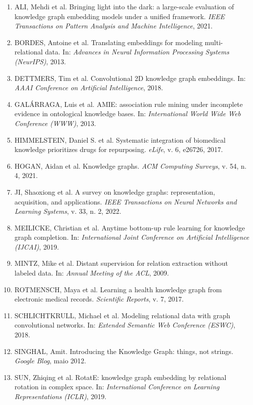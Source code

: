 \documentclass[12pt, a4paper]{article}
\providecommand{\tightlist}{%
  \setlength{\itemsep}{0pt}\setlength{\parskip}{0pt}}
\begin{document}
\begin{enumerate}
\def\labelenumi{\arabic{enumi}.}
\tightlist
\item
  ALI, Mehdi et al. Bringing light into the dark: a large-scale evaluation of knowledge graph embedding models under a unified framework. \emph{IEEE Transactions on Pattern Analysis and Machine Intelligence}, 2021.
\item
  BORDES, Antoine et al. Translating embeddings for modeling multi-relational data. In: \emph{Advances in Neural Information Processing Systems (NeurIPS)}, 2013.
\item
  DETTMERS, Tim et al. Convolutional 2D knowledge graph embeddings. In: \emph{AAAI Conference on Artificial Intelligence}, 2018.
\item
  GALÁRRAGA, Luis et al. AMIE: association rule mining under incomplete evidence in ontological knowledge bases. In: \emph{International World Wide Web Conference (WWW)}, 2013.
\item
  HIMMELSTEIN, Daniel S. et al. Systematic integration of biomedical knowledge prioritizes drugs for repurposing. \emph{eLife}, v. 6, e26726, 2017.
\item
  HOGAN, Aidan et al. Knowledge graphs. \emph{ACM Computing Surveys}, v. 54, n. 4, 2021.
\item
  JI, Shaoxiong et al. A survey on knowledge graphs: representation, acquisition, and applications. \emph{IEEE Transactions on Neural Networks and Learning Systems}, v. 33, n. 2, 2022.
\item
  MEILICKE, Christian et al. Anytime bottom-up rule learning for knowledge graph completion. In: \emph{International Joint Conference on Artificial Intelligence (IJCAI)}, 2019.
\item
  MINTZ, Mike et al. Distant supervision for relation extraction without labeled data. In: \emph{Annual Meeting of the ACL}, 2009.
\item
  ROTMENSCH, Maya et al. Learning a health knowledge graph from electronic medical records. \emph{Scientific Reports}, v. 7, 2017.
\item
  SCHLICHTKRULL, Michael et al. Modeling relational data with graph convolutional networks. In: \emph{Extended Semantic Web Conference (ESWC)}, 2018.
\item
  SINGHAL, Amit. Introducing the Knowledge Graph: things, not strings. \emph{Google Blog}, maio 2012.
\item
  SUN, Zhiqing et al. RotatE: knowledge graph embedding by relational rotation in complex space. In: \emph{International Conference on Learning Representations (ICLR)}, 2019.

\end{enumerate}
\end{document}
